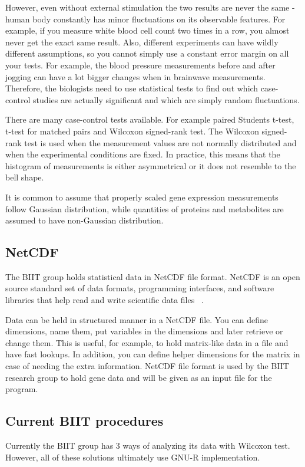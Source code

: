 \documentclass[12pt]{article}
\begin{document}
{However, even without external stimulation the two results are never the same - human body constantly has minor fluctuations on its observable features. For example, if you measure white blood cell count two times in a row, you almost never get the exact same result. Also, different experiments can have wildly different assumptions, so you cannot simply use a constant error margin on all your tests. For example, the blood pressure measurements before and after jogging can have a lot bigger changes when in brainwave measurements. Therefore, the biologists need to use statistical tests to find out which case-control studies are actually significant and which are simply random fluctuations.

There are many case-control tests available. For example paired Students t-test, t-test for matched pairs and Wilcoxon signed-rank test. The Wilcoxon signed-rank test is used when the measurement values are not normally distributed and when the experimental conditions are fixed.  In practice, this means that the histogram of measurements is either asymmetrical or it does not resemble to the bell shape.

It is common to assume that properly scaled gene expression measurements follow Gaussian distribution, while quantities of proteins and metabolites are assumed to have non-Gaussian distribution.

\subsection{NetCDF}
The BIIT group holds statistical data in NetCDF file format. NetCDF is an open source standard set of data formats, programming interfaces, and software libraries that help read and write scientific data files ~\cite{Netcdf}.

Data can be held in structured manner in a NetCDF file. You can define dimensions, name them, put variables in the dimensions and later retrieve or change them. This is useful, for example, to hold matrix-like data in a file and have fast lookups. In addition, you can define helper dimensions for the matrix in case of needing the extra information. NetCDF file format is used by the BIIT research group to hold gene data and will be given as an input file for the program.

\subsection{Current BIIT procedures}
Currently the BIIT group has 3 ways of analyzing its data with Wilcoxon test. However, all of these solutions ultimately use GNU-R implementation.
}
\end{document}
